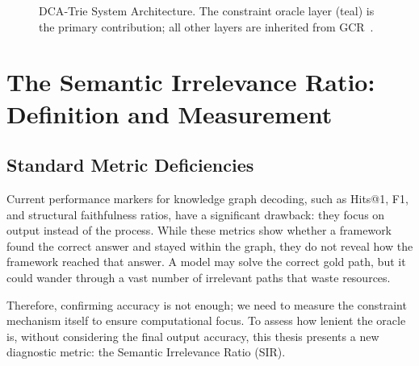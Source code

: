 \begin{figure}[H]
{
  }%
  \caption[DCA‑Trie System Architecture]{DCA‑Trie System Architecture. The constraint oracle layer (teal) is the primary contribution; all other layers are inherited from GCR~\citep{luo2025-graph-constrained-reasoning}.}
  \label{fig:architecture}
\end{figure}

\section{The Semantic Irrelevance Ratio: Definition and Measurement}
\label{sec:ch3sir}

\subsection{Standard Metric Deficiencies}

Current performance markers for knowledge graph decoding, such as Hits@1, F1, and structural faithfulness ratios, have a significant drawback: they focus on output instead of the process. While these metrics show whether a framework found the correct answer and stayed within the graph, they do not reveal how the framework reached that answer. A model may solve the correct gold path, but it could wander through a vast number of irrelevant paths that waste resources.

Therefore, confirming accuracy is not enough; we need to measure the constraint mechanism itself to ensure computational focus. To assess how lenient the oracle is, without considering the final output accuracy, this thesis presents a new diagnostic metric: the Semantic Irrelevance Ratio (SIR).

